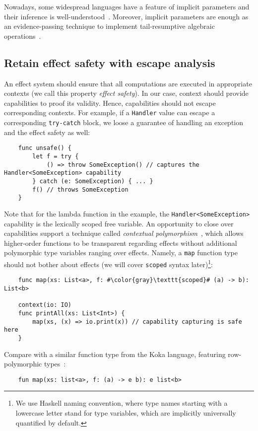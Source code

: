\documentclass[acmsmall]{acmart}
\begin{document}
Nowadays, some widespread languages have a feature of implicit parameters and their inference is well-understood~\cite{KEEP-context-parameters, oliveira2010type, lewis2000implicit}.
Moreover, implicit parameters are enough as an evidence-passing technique to implement tail-resumptive algebraic operations~\cite{xie2020effect}.

\subsection{Retain effect safety with escape analysis} \label{subsec:escape}

An effect system should ensure that all computations are executed in appropriate contexts (we call this property \textit{effect safety}).
In our case, context should provide capabilities to proof its validity.
Hence, capabilities should not escape corresponding contexts.
For example, if a \texttt{Handler} value can escape a corresponding \texttt{try-catch} block, we loose a guarantee of handling an exception and the effect safety as well:
\begin{verbatim}
    func unsafe() {
        let f = try {
            () => throw SomeException() // captures the Handler<SomeException> capability
        } catch (e: SomeException) { ... }
        f() // throws SomeException
    }
\end{verbatim}

Note that for the lambda function in the example, the \texttt{Handler<SomeException>} capability is the lexically scoped free variable.
An opportunity to close over capabilities support a technique called \textit{contextual polymorphism}~\cite{brachthauser2020effects, brachthauser2022effects}, which allows higher-order functions to be transparent regarding effects without additional polymorphic type variables ranging over effects.
Namely, a \texttt{map} function type should not bother about effects (we will cover \texttt{scoped} syntax later)\footnote{We use Haskell naming convention, where type names starting with a lowercase letter stand for type variables, which are implicitly universally quantified by default.}:
\begin{verbatim}
    func map(xs: List<a>, f: #\color{gray}\texttt{scoped}# (a) -> b): List<b>

    context(io: IO)
    func printAll(xs: List<Int>) {
        map(xs, (x) => io.print(x)) // capability capturing is safe here
    }
\end{verbatim}

Compare with a similar function type from the Koka language, featuring row-polymorphic types~\cite{leijen2014koka}:
\begin{verbatim}
    fun map(xs: list<a>, f: (a) -> e b): e list<b>
\end{verbatim}
\end{document}
